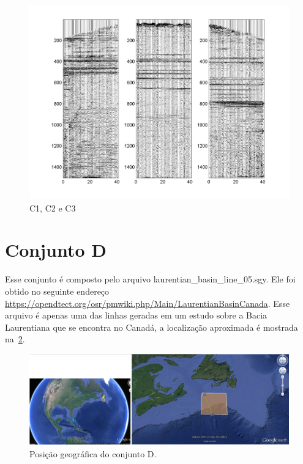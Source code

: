 \begin{figure}[!h]
\centering
\includegraphics[scale=1.01]{fig/fig_C2.png}
\caption{C1, C2 e C3}
\label{Figura:c1c2c3comp}
\end{figure}

\section{Conjunto D}

Esse conjunto é composto pelo arquivo laurentian\_basin\_line\_05.sgy. Ele foi
obtido no seguinte endereço
\url{https://opendtect.org/osr/pmwiki.php/Main/LaurentianBasinCanada}. Esse
arquivo é apenas uma das linhas geradas em um estudo sobre a Bacia Laurentiana
que se encontra no Canadá, a localização aproximada é mostrada
na~\ref{Figura:geograficamentefigd}.

\begin{figure}[ht]
\centering
\includegraphics[scale=0.75]{fig/gps_img_d.png}
\caption[Posição do conjunto D]{Posição geográfica do conjunto D.}
\label{Figura:geograficamentefigd}
\end{figure}

